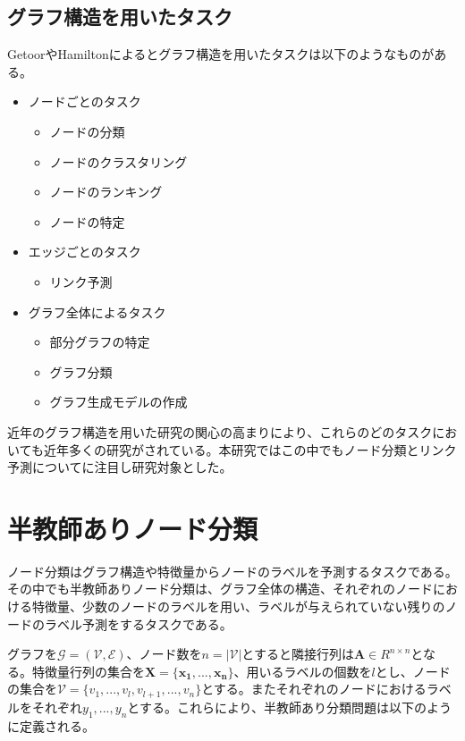 \subsection{グラフ構造を用いたタスク}
Getoor\cite{getoor2005link}やHamilton\cite{hamilton2020graph}によるとグラフ構造を用いたタスクは以下のようなものがある。
\begin{itemize}
\item ノードごとのタスク
	\begin{itemize}
	\item ノードの分類
	\item ノードのクラスタリング
	\item ノードのランキング
    \item ノードの特定
	\end{itemize}
\item エッジごとのタスク
	\begin{itemize}
	\item リンク予測
	\end{itemize}
\item グラフ全体によるタスク
	\begin{itemize}
    \item 部分グラフの特定
    \item グラフ分類
    \item グラフ生成モデルの作成
	\end{itemize}
\end{itemize}

近年のグラフ構造を用いた研究の関心の高まりにより、これらのどのタスクにおいても近年多くの研究がされている。本研究ではこの中でもノード分類とリンク予測についてに注目し研究対象とした。


\section{半教師ありノード分類}
ノード分類はグラフ構造や特徴量からノードのラベルを予測するタスクである。その中でも半教師ありノード分類は、グラフ全体の構造、それぞれのノードにおける特徴量、少数のノードのラベルを用い、ラベルが与えられていない残りのノードのラベル予測をするタスクである。

グラフを$\mathcal{G}=(\mathcal{V},\mathcal{E})$、ノード数を$n = |\mathcal{V}|$とすると隣接行列は$\mathbf{A} \in R^{n\times n}$となる。特徴量行列の集合を$\mathbf{X} = \{\boldsymbol{x_{1}},..., \boldsymbol{x_{n}}\}$、用いるラベルの個数を$l$とし、ノードの集合を$\mathcal{V} = \{ v_{1}, . . . , v_{l}, v_{l+1}, . . . , v_{n}\}$とする。またそれぞれのノードにおけるラベルをそれぞれ$y_{1}, ..., y_{n}$とする。これらにより、半教師あり分類問題は以下のように定義される。

